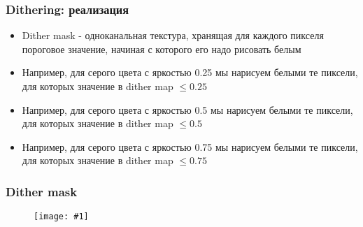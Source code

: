 \documentclass{beamer}
\newcommand{\slideimage}[1]{
  \begin{figure}
    \begin{adjustbox}{width=\textwidth, totalheight=\textheight-2\baselineskip-2\baselineskip,keepaspectratio}
      \texttt{[image: \#1]}
    \end{adjustbox}
  \end{figure}
}
\begin{document}
\begin{frame}[fragile]
\frametitle{Dithering: реализация}
\begin{itemize}
\item Dither mask - одноканальная текстура, хранящая для каждого пикселя пороговое значение, начиная с которого его надо рисовать белым
\pause
\item Например, для серого цвета с яркостью 0.25 мы нарисуем белыми те пиксели, для которых значение в dither map \begin{math}\leq 0.25\end{math}
\pause
\item Например, для серого цвета с яркостью 0.5 мы нарисуем белыми те пиксели, для которых значение в dither map \begin{math}\leq 0.5\end{math}
\pause
\item Например, для серого цвета с яркостью 0.75 мы нарисуем белыми те пиксели, для которых значение в dither map \begin{math}\leq 0.75\end{math}
\end{itemize}
\end{frame}

\begin{frame}[fragile]
\frametitle{Dither mask}
\slideimage{dither-mask.png}
\end{frame}
\end{document}
